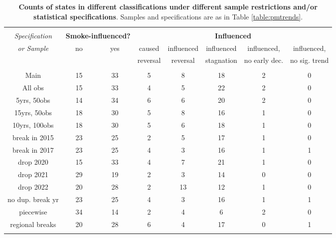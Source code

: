 
\begin{table}[!htbp] \centering 
  \caption{\textbf{Counts of states in different classifications under different sample restrictions and/or statistical specifications}. Samples and specifications are as in Table \ref{table:pmtrends}.} 
  \label{table:smokeinfluence} 
\footnotesize 
\begin{tabular}{@{\extracolsep{5pt}} cccccccc} 
\\[-1.8ex]\hline 
\hline \\[-1.8ex] 
\textit{Specification} & \multicolumn{2}{c}{\textbf{Smoke-influenced?}} & \multicolumn{5}{c}{\textbf{Influenced}} \\ \cline{4-8}
\textit{or Sample} & no & yes & caused & influenced  & influenced  & influenced, & influenced, \\ 
 &  &  & reversal & reversal &  stagnation & no early dec. & no sig. trend\\ 
\hline \\[-1.8ex] 
Main & 15 & 33 & 5 & 8 & 18 & 2 & 0 \\ 
All obs & 15 & 33 & 4 & 5 & 22 & 2 & 0 \\ 
5yrs, 50obs & 14 & 34 & 6 & 6 & 20 & 2 & 0 \\ 
15yrs, 50obs & 18 & 30 & 5 & 8 & 16 & 1 & 0 \\ 
10yrs, 100obs & 18 & 30 & 5 & 6 & 18 & 1 & 0 \\ 
break in 2015 & 23 & 25 & 2 & 5 & 17 & 1 & 0 \\ 
break in 2017 & 23 & 25 & 4 & 3 & 16 & 1 & 1 \\ 
drop 2020 & 15 & 33 & 4 & 7 & 21 & 1 & 0 \\ 
drop 2021 & 29 & 19 & 2 & 3 & 14 & 0 & 0 \\ 
drop 2022 & 20 & 28 & 2 & 13 & 12 & 1 & 0 \\ 
no dup. break yr & 23 & 25 & 4 & 3 & 16 & 1 & 1 \\ 
piecewise & 34 & 14 & 2 & 4 & 6 & 2 & 0 \\ 
regional breaks & 20 & 28 & 6 & 4 & 17 & 0 & 1 \\ 
\hline \\[-1.8ex] 
\end{tabular} 
\end{table} 
